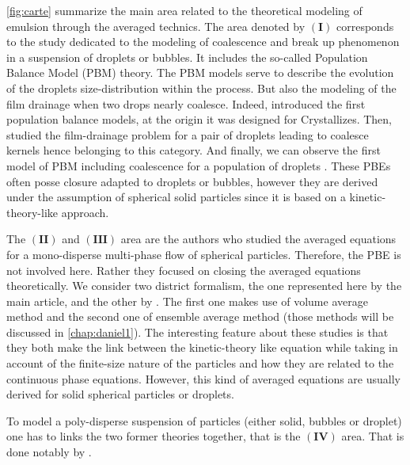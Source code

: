 \ref{fig:carte} summarize the main area related to the theoretical modeling of emulsion through the averaged technics. 
The area denoted by $\bm{(I)}$ corresponds to the study dedicated to the modeling of coalescence and break up phenomenon in a suspension of droplets or bubbles.
It includes the so-called Population Balance Model (PBM) theory.
The PBM models serve to describe the evolution of the droplets size-distribution within the process. 
But also the modeling of the film drainage when two drops nearly coalesce. 
Indeed, \citet{randolph2012theory} introduced the first population balance models, at the origin it was designed  for Crystallizes. 
Then, \citet{chesters1991modelling} studied the film-drainage problem for a pair of droplets leading to coalesce kernels hence belonging to this category.
And finally, we can observe the first model of PBM including coalescence for a population of droplets \citep{KAMP20011363}.  
These PBEs often posse closure adapted to droplets or bubbles, however they are derived under the assumption of spherical solid particles since it is based on a kinetic-theory-like approach. 

The $\bm{(II)}$ and $\bm{(III)}$ area are the authors who studied the averaged equations for a mono-disperse multi-phase flow of spherical particles.
Therefore, the PBE is not involved here.
Rather they focused on closing the averaged equations theoretically. 
We consider two district formalism, the one represented here by the main article, \citet{jackson1997locally} and the other by \citet{zhang1994averaged}.
The first one makes use of volume average method and the second one of ensemble average method (those methods will be discussed in \ref{chap:daniel1}).
The interesting feature about these studies is that they both make the link between the kinetic-theory like equation while taking in account of the finite-size nature of the particles and how they are related to the continuous phase equations. 
However, this kind of averaged equations are usually derived for solid spherical particles or droplets. 

To model a poly-disperse suspension of particles (either solid, bubbles or droplet) one has to links the two former theories together, that is the $\bm{(IV)}$ area. 
That is done notably by \citep{lhuillier2000bilan,morel2015mathematical,salehi2017population,gemello2018modelling}. 


